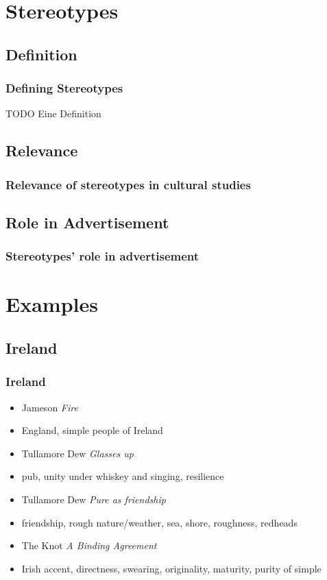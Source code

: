 \documentclass{beamer}
\begin{document}
\section{Stereotypes}

\subsection{Definition}

\begin{frame}
 \frametitle{Defining Stereotypes}
  \begin{Definition}
    TODO Eine Definition
  \end{Definition}
\end{frame}

\subsection{Relevance}

\begin{frame}
 \frametitle{Relevance of stereotypes in cultural studies}
\end{frame}

\subsection{Role in Advertisement}

\begin{frame}
 \frametitle{Stereotypes' role in advertisement}
\end{frame}

\section{Examples}
\subsection{Ireland}

\begin{frame}
 \frametitle{Ireland}
 \begin{itemize}
  \item <1-> Jameson \emph{Fire}
  \item <2-> England, simple people of Ireland
  \item<3-> Tullamore Dew \emph{Glasses up}
  \item<4-> pub, unity under whiskey and singing, resilience
  \item<5-> Tullamore Dew \emph{Pure as friendship}
  \item<6-> friendship, rough nature/weather, sea, shore, roughness, redheads
  \item<7-> The Knot \emph{A Binding Agreement}
  \item<8> Irish accent, directness, swearing, originality, maturity, purity of simple
\end{itemize}
\end{frame}
\end{document}
